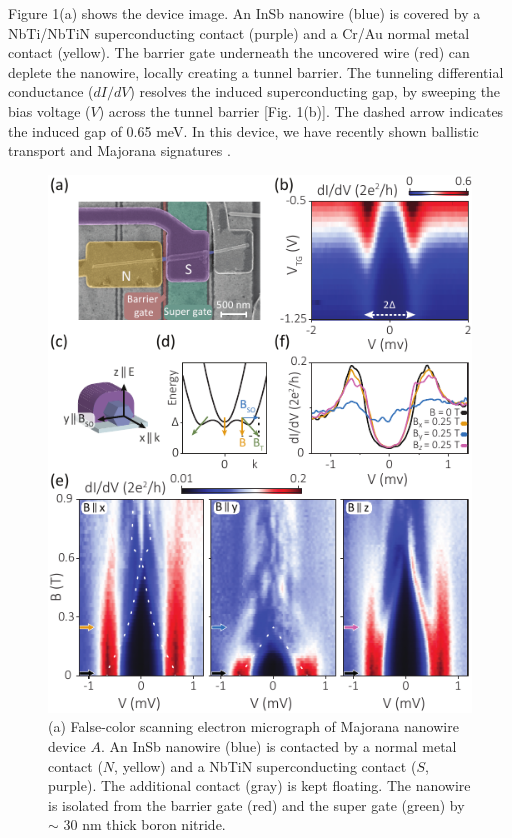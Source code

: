 Figure 1(a) shows the device image.
An InSb nanowire (blue) is covered by a NbTi/NbTiN superconducting contact (purple) and a Cr/Au normal metal contact (yellow).
The barrier gate underneath the uncovered wire (red) can deplete the nanowire, locally creating a tunnel barrier.
The tunneling differential conductance ($dI/dV$) resolves the induced superconducting gap, by sweeping the bias voltage ($V$) across the tunnel barrier [Fig. 1(b)].
The dashed arrow indicates the induced gap of 0.65 meV.
In this device, we have recently shown ballistic transport and Majorana signatures \cite{BalMaj}.
\begin{figure}
\includegraphics[width=\columnwidth]{chapter_spinorbit/figures/Fig1.pdf}
\caption{\label{fig1}
(a) False-color scanning electron micrograph of Majorana nanowire device $A$.
An InSb nanowire (blue) is contacted by a normal metal contact ($N$, yellow) and a NbTiN superconducting contact ($S$, purple).
The additional contact (gray) is kept floating.
The nanowire is isolated from the barrier gate (red) and the super gate (green) by $\sim$ 30 nm thick boron nitride.
}
\end{figure}

